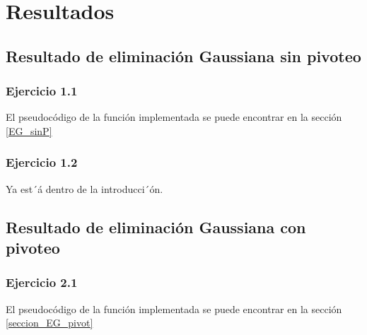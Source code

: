 \section{Resultados}
\label{resultados}



\iffalse
\subsection{Resultado de eliminación Gaussiana sin pivoteo}
\label{resultados EG}

\subsubsection{Ejercicio 1.1}
El pseudocódigo de la función implementada se puede encontrar en la sección \ref{EG_sinP}

\subsubsection{Ejercicio 1.2}

Ya est´á dentro de la introducci´ón.

\subsection{Resultado de eliminación Gaussiana con pivoteo}
\label{resultados EG c/p}
\subsubsection{Ejercicio 2.1}
El pseudocódigo de la función implementada se puede encontrar en la sección \ref{seccion_EG_pivot}

